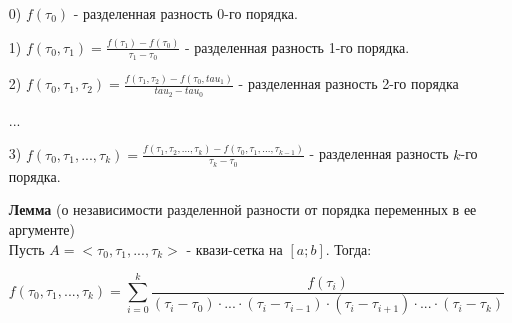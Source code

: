 \documentclass[__main__.tex]{subfiles}
\begin{document}
\begin{itemize}
\item[0)] $f(\tau_0)$ - разделенная разность 0-го порядка.
\item[1)] $f(\tau_0, \tau_1) = \frac{f(\tau_1) - f(\tau_0)}{\tau_1 - \tau_0}$ - разделенная разность 1-го порядка.
\item[2)] $f(\tau_0, \tau_1, \tau_2) = \frac{f(\tau_1, \tau_2) - f(\tau_0, tau_1)}{tau_2 - tau_0}$ - разделенная разность 2-го порядка
\item[...]
\item[3)] $f(\tau_0, \tau_1, \text{...}, \tau_k) = \frac{f(\tau_1, \tau_2, \text{...}, \tau_k) - f(\tau_0, \tau_1, \text{...}, \tau_{k-1})}{\tau_k - \tau_0}$ - разделенная разность $k$-го порядка.

\textbf{Лемма} (о независимости разделенной разности от порядка переменных в ее аргументе)\\
Пусть $A = <\tau_0, \tau_1, \text{...}, \tau_k>$ - квази-сетка на $[a;b]$. Тогда:

$$f(\tau_0, \tau_1, \text{...}, \tau_k) = \sum_{i = 0}^k \frac{f(\tau_i)}{(\tau_i - \tau_0) \cdot \text{...} \cdot (\tau_i - \tau_{i - 1}) \cdot (\tau_i - \tau_{i+1}) \cdot \text{...} \cdot (\tau_i - \tau_k)}$$
 
\end{itemize}
\end{document}
